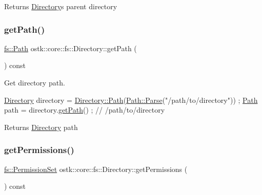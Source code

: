 \begin{DoxyReturn}{Returns}
\hyperlink{classostk_1_1core_1_1fs_1_1_directory}{Directory}\textquotesingle{}s parent directory 
\end{DoxyReturn}
\mbox{\label{classostk_1_1core_1_1fs_1_1_directory_adc130a2677b99fd23e1f816db521f857}} 
\subsubsection{\texorpdfstring{get\+Path()}{getPath()}}
{\footnotesize\ttfamily \hyperlink{classostk_1_1core_1_1fs_1_1_path}{fs\+::\+Path} ostk\+::core\+::fs\+::\+Directory\+::get\+Path (\begin{DoxyParamCaption}{ }\end{DoxyParamCaption}) const}



Get directory path. 


\begin{DoxyCode}
\hyperlink{classostk_1_1core_1_1fs_1_1_directory_adc893e10f55282be0d0455e9cfc5796b}{Directory} directory = \hyperlink{classostk_1_1core_1_1fs_1_1_directory_a0151dba2940d5f426b52209dc7dab2e5}{Directory::Path}(\hyperlink{classostk_1_1core_1_1fs_1_1_path_ad08539ba654f5df11c4bcb07276345ad}{Path::Parse}(\textcolor{stringliteral}{"/path/to/directory"}))
       ;
\hyperlink{classostk_1_1core_1_1fs_1_1_directory_a0151dba2940d5f426b52209dc7dab2e5}{Path} path = directory.\hyperlink{classostk_1_1core_1_1fs_1_1_directory_adc130a2677b99fd23e1f816db521f857}{getPath}() ; \textcolor{comment}{// /path/to/directory}
\end{DoxyCode}


\begin{DoxyReturn}{Returns}
\hyperlink{classostk_1_1core_1_1fs_1_1_directory}{Directory} path 
\end{DoxyReturn}
\mbox{\label{classostk_1_1core_1_1fs_1_1_directory_a2a566a9e0ecf33f6903b51678ecb5999}} 
\subsubsection{\texorpdfstring{get\+Permissions()}{getPermissions()}}
{\footnotesize\ttfamily \hyperlink{classostk_1_1core_1_1fs_1_1_permission_set}{fs\+::\+Permission\+Set} ostk\+::core\+::fs\+::\+Directory\+::get\+Permissions (\begin{DoxyParamCaption}{ }\end{DoxyParamCaption}) const}



